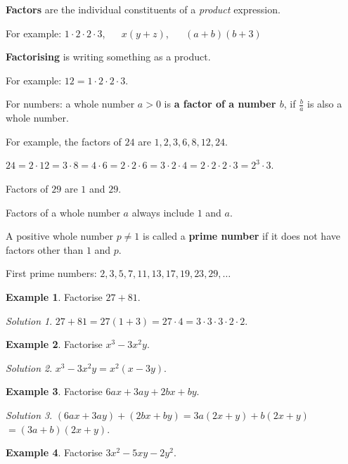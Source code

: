 \documentclass[
  english,
  12pt,
  oneside]{book}
\theoremstyle{definition}
\theoremstyle{definition}
\newtheorem{example}{Example}[chapter]
\theoremstyle{definition}
\theoremstyle{definition}
\theoremstyle{remark}
\newtheorem*{solution}{Solution}
\begin{document}
\textbf{Factors} are the individual constituents of a \emph{product} expression.

For example: \(1\cdot 2\cdot 2\cdot 3\), ~~ \(x(y+z)\), ~~ \((a+b)(b+3)\)

\textbf{Factorising} is writing something as a product.

For example: \(12 = 1\cdot 2\cdot 2\cdot 3\).

For numbers: a whole number \(a>0\) is \textbf{a factor of a number \(b\)}, if \(\frac{b}{a}\) is also a whole number.

For example, the factors of \(24\) are \(1,2,3,6,8,12,24\).

\(24 = 2\cdot 12 = 3\cdot 8 = 4\cdot 6 = 2\cdot 2\cdot 6 = 3\cdot2\cdot 4 = 2\cdot 2\cdot 2\cdot 3 = 2^3\cdot 3\).

Factors of \(29\) are \(1\) and \(29\).

Factors of a whole number \(a\) always include \(1\) and \(a\).

A positive whole number \(p\neq1\) is called a \textbf{prime number} if it does not have factors other than \(1\) and \(p\).

First prime numbers: \(2,3,5,7,11,13,17,19,23,29,\dots\)

\begin{example}
Factorise \(27+81\).
\end{example}

\begin{solution}
\(27+81 = 27(1+3)=27\cdot 4 = 3\cdot3\cdot3\cdot2\cdot2\).
\end{solution}

\begin{example}
Factorise \(x^3-3x^2y\).
\end{example}

\begin{solution}
\(x^3-3x^2y = x^2(x-3y)\).
\end{solution}

\begin{example}
Factorise \(6ax+3ay+2bx+by\).
\end{example}

\begin{solution}
\((6ax+3ay)+(2bx+by) = 3a(2x+y)+b(2x+y)\) \(=(3a+b)(2x+y)\).
\end{solution}

\begin{example}
Factorise \(3x^2-5xy-2y^2\).
\end{example}
\end{document}
